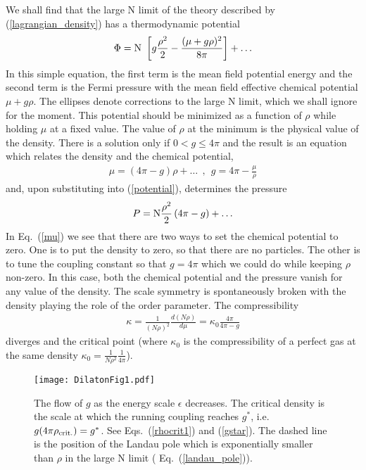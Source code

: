 \documentclass[twocolumn,secnumarabic,amssymb, nobibnotes, aps, prd]{revtex4}
\begin{document}
 We shall find that the large N limit of the theory described by (\ref{lagrangian_density}) has
 a thermodynamic potential
\begin{align}\label{potential}
\Phi = {\rm  N} ~\left[ g\frac{\rho^2}{2}- \frac{(\mu+g\rho)^2}{8\pi}\right]+\ldots
\end{align}
In this simple equation, the first term is the mean field potential energy  and the second term is the
Fermi pressure with the mean field effective chemical potential $\mu+g\rho$. 
The ellipses  denote corrections to the large N limit, which we shall ignore for the moment. 
This potential should be minimized as a function
of  $\rho$ while holding $\mu$ at a fixed value.  
The value of $\rho$ at the minimum is the physical value of the density. 
There is a solution only if $0<g\leq 4\pi$ and the result is 
an equation which relates the density and the chemical potential, 
\begin{align}\label{mu}
\mu=(4\pi-g)\rho +\ldots ~~,~~g=4\pi-\frac{\mu}{\rho}
\end{align}
and, upon substituting into (\ref{potential}),  determines the pressure
\begin{align}\label{pressure1}
P = {\rm  N}\frac{\rho^2}{2} \left(4\pi - g \right)+\ldots
\end{align}
In Eq.\  (\ref{mu}) we see that there are two ways to set the chemical potential to zero.  One is to 
put the density to zero, so that there are no particles.  The other is to  tune the coupling constant 
so that $g=4\pi$ which we could do while keeping $\rho$ non-zero.  
In this case, both the chemical potential and the pressure vanish for any value of the
density.  The scale symmetry is spontaneously broken with the density playing
the role of the order parameter. 
The compressibility  
\begin{align}\label{kappa}
\kappa = \frac{1}{(N\rho)^2} \frac{d(N\rho)}{d\mu} %
=\kappa_0\frac{4\pi}{4\pi-g}
\end{align}
 diverges and the critical point (where $\kappa_0$ is the compressibility of a perfect gas at the same density $\kappa_0= \frac{1}{N\rho^2}\frac{1}{4\pi}$). 
\begin{figure}
\texttt{[image: DilatonFig1.pdf]}\\
\begin{caption} {  The flow of  $g $ as  the
 energy scale $\epsilon$  decreases. 
The critical density is the scale at which the running coupling reaches $g^*$, i.e. $g(4\pi\rho_{\rm crit.})=g^*$. 
See Eqs.\  (\ref{rhocrit1}) and (\ref{gstar}). 
The dashed line is the position of the Landau
pole which is exponentially smaller than $\rho$ in
the large N limit (  Eq.\ (\ref{landau_pole})).
    \label{flow}  
}\end{caption}
 \end{figure}  
 
\end{document}
